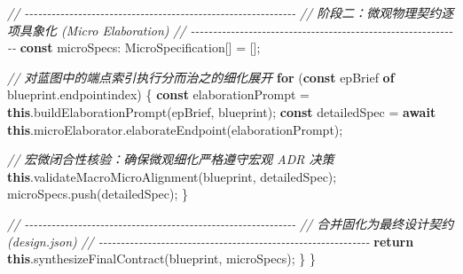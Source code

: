 \documentclass[
]{ctexart}
\newenvironment{Shaded}{}{}
\newcommand{\AttributeTok}[1]{\textcolor[rgb]{0.49,0.56,0.16}{#1}}
\newcommand{\CommentTok}[1]{\textcolor[rgb]{0.38,0.63,0.69}{\textit{#1}}}
\newcommand{\ControlFlowTok}[1]{\textcolor[rgb]{0.00,0.44,0.13}{\textbf{#1}}}
\newcommand{\FunctionTok}[1]{\textcolor[rgb]{0.02,0.16,0.49}{#1}}
\newcommand{\KeywordTok}[1]{\textcolor[rgb]{0.00,0.44,0.13}{\textbf{#1}}}
\newcommand{\NormalTok}[1]{#1}
\newcommand{\OperatorTok}[1]{\textcolor[rgb]{0.40,0.40,0.40}{#1}}
\renewcommand{\_}{\discretionary{}{}{\textunderscore}}
\begin{document}
\begin{Shaded}
\begin{Highlighting}[]
    \CommentTok{// {-}{-}{-}{-}{-}{-}{-}{-}{-}{-}{-}{-}{-}{-}{-}{-}{-}{-}{-}{-}{-}{-}{-}{-}{-}{-}{-}{-}{-}{-}{-}{-}{-}{-}{-}{-}{-}{-}{-}{-}{-}{-}{-}{-}{-}{-}{-}{-}{-}{-}{-}{-}{-}{-}{-}{-}{-}{-}{-}{-}{-}}
    \CommentTok{// 阶段二：微观物理契约逐项具象化 (Micro Elaboration)}
    \CommentTok{// {-}{-}{-}{-}{-}{-}{-}{-}{-}{-}{-}{-}{-}{-}{-}{-}{-}{-}{-}{-}{-}{-}{-}{-}{-}{-}{-}{-}{-}{-}{-}{-}{-}{-}{-}{-}{-}{-}{-}{-}{-}{-}{-}{-}{-}{-}{-}{-}{-}{-}{-}{-}{-}{-}{-}{-}{-}{-}{-}{-}{-}}
    \KeywordTok{const}\NormalTok{ microSpecs}\OperatorTok{:}\NormalTok{ MicroSpecification[] }\OperatorTok{=}\NormalTok{ []}\OperatorTok{;}
    
    \CommentTok{// 对蓝图中的端点索引执行分而治之的细化展开}
    \ControlFlowTok{for}\NormalTok{ (}\KeywordTok{const}\NormalTok{ epBrief }\KeywordTok{of}\NormalTok{ blueprint}\OperatorTok{.}\AttributeTok{endpoint\_index}\NormalTok{) \{}
      \KeywordTok{const}\NormalTok{ elaborationPrompt }\OperatorTok{=} \KeywordTok{this}\OperatorTok{.}\FunctionTok{buildElaborationPrompt}\NormalTok{(epBrief}\OperatorTok{,}\NormalTok{ blueprint)}\OperatorTok{;}
      \KeywordTok{const}\NormalTok{ detailedSpec }\OperatorTok{=} \ControlFlowTok{await} \KeywordTok{this}\OperatorTok{.}\AttributeTok{microElaborator}\OperatorTok{.}\FunctionTok{elaborateEndpoint}\NormalTok{(elaborationPrompt)}\OperatorTok{;}
      
      \CommentTok{// 宏微闭合性核验：确保微观细化严格遵守宏观 ADR 决策}
      \KeywordTok{this}\OperatorTok{.}\FunctionTok{validateMacroMicroAlignment}\NormalTok{(blueprint}\OperatorTok{,}\NormalTok{ detailedSpec)}\OperatorTok{;}
\NormalTok{      microSpecs}\OperatorTok{.}\FunctionTok{push}\NormalTok{(detailedSpec)}\OperatorTok{;}
\NormalTok{    \}}

    \CommentTok{// {-}{-}{-}{-}{-}{-}{-}{-}{-}{-}{-}{-}{-}{-}{-}{-}{-}{-}{-}{-}{-}{-}{-}{-}{-}{-}{-}{-}{-}{-}{-}{-}{-}{-}{-}{-}{-}{-}{-}{-}{-}{-}{-}{-}{-}{-}{-}{-}{-}{-}{-}{-}{-}{-}{-}{-}{-}{-}{-}{-}{-}}
    \CommentTok{// 合并固化为最终设计契约 (design.json)}
    \CommentTok{// {-}{-}{-}{-}{-}{-}{-}{-}{-}{-}{-}{-}{-}{-}{-}{-}{-}{-}{-}{-}{-}{-}{-}{-}{-}{-}{-}{-}{-}{-}{-}{-}{-}{-}{-}{-}{-}{-}{-}{-}{-}{-}{-}{-}{-}{-}{-}{-}{-}{-}{-}{-}{-}{-}{-}{-}{-}{-}{-}{-}{-}}
    \ControlFlowTok{return} \KeywordTok{this}\OperatorTok{.}\FunctionTok{synthesizeFinalContract}\NormalTok{(blueprint}\OperatorTok{,}\NormalTok{ microSpecs)}\OperatorTok{;}
\NormalTok{  \}}
\NormalTok{\}}
\end{Highlighting}
\end{Shaded}
\end{document}
